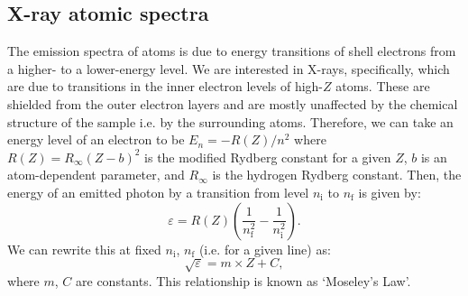 \documentclass[11pt,a4paper,twoside,onecolumn]{article}
\newcommand{\rydberg}{R}
\begin{document}
\subsection{X-ray atomic spectra}
The emission spectra of atoms is due to energy transitions of shell electrons from a higher- to a lower-energy level. We are interested in X-rays, specifically, which are due to transitions in the inner electron levels of high-$Z$ atoms. These are shielded from the outer electron layers and are mostly unaffected by the chemical structure of the sample i.e. by the surrounding atoms. Therefore, we can take an energy level of an electron to be $E_n = -\rydberg\left(Z\right) / n^2$ where $\rydberg \left(Z\right)= \rydberg_\infty \left(Z - b\right)^2$ is the modified Rydberg constant for a given $Z$, $b$ is an atom-dependent parameter, and $\rydberg_\infty$ is the hydrogen Rydberg constant. Then, the energy of an emitted photon by a transition from level $n_\mathrm{i}$ to $n_\mathrm{f}$ is given by:
\begin{equation}\label{eqn:x-ray-energy}
    \varepsilon = \rydberg\left(Z\right) \left(\frac{1}{n_\mathrm{f}^2} - \frac{1}{n_\mathrm{i}^2}\right).
\end{equation}
We can rewrite this at fixed $n_\mathrm{i}$, $n_\mathrm{f}$ (i.e. for a given line) as:
\begin{equation}\label{eqn:moseleys-eqn}
    \sqrt{\varepsilon} = m \times Z + C,
\end{equation}  where $m$, $C$ are constants. This relationship is known as `Moseley's Law'.
\end{document}
